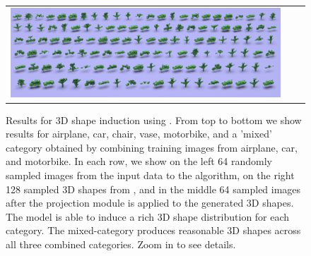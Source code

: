 \begin{figure}[h!]
\begin{center}
\begin{tabular}{ccc}
    \includegraphics[height=\fh]{prgan/fig/mix/output.png} \\
  \end{tabular}
  \end{center}
  \vspace{-6pt}
  \caption{\small \label{fig:generate-shapes} Results for 3D shape induction using \prgans. From top to bottom we show results for airplane, car, chair, vase, motorbike, and a 'mixed' category obtained by combining training images from airplane, car, and motorbike. In each row, we show on the left 64 randomly sampled images from the input data to the algorithm, on the right 128 sampled 3D shapes from \prgan, and in the middle 64 sampled images after the projection module is applied to the generated 3D shapes. The model is able to induce a rich 3D shape distribution for each category. The mixed-category produces reasonable 3D shapes across all three combined categories. Zoom in to see details.}
\end{figure}

